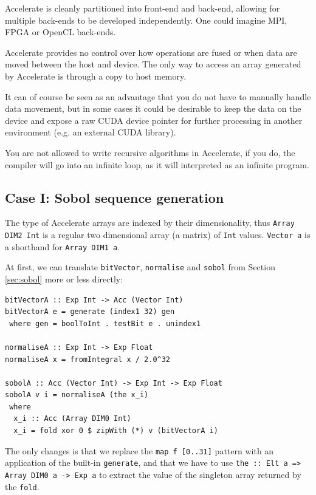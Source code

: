 \documentclass[preprint]{sigplanconf}
\begin{document}


Accelerate is cleanly partitioned into front-end and back-end,
allowing for multiple back-ends to be developed independently. One
could imagine MPI, FPGA or OpenCL back-ends.

Accelerate provides no control over how operations are fused or when
data are moved between the host and device. The only way to access an
array generated by Accelerate is through a copy to host memory.

It can of course be seen as an advantage that you do not have to
manually handle data movement, but in some cases it could be desirable
to keep the data on the device and expose a raw CUDA device pointer
for further processing in another environment (e.g. an external CUDA
library).

You are not allowed to write recursive algorithms in Accelerate, if
you do, the compiler will go into an infinite loop, as it will
interpreted as an infinite program.

\subsection{Case I: Sobol sequence generation}
The type of Accelerate arrays are indexed by their dimensionality,
thus \verb|Array DIM2 Int| is a regular two dimensional array (a
matrix) of \verb|Int| values.  \verb|Vector a| is a shorthand for
\verb|Array DIM1 a|.

At first, we can translate \verb|bitVector|, \verb|normalise| and
\verb|sobol| from Section \ref{sec:sobol} more or less directly:
\begin{verbatim}
bitVectorA :: Exp Int -> Acc (Vector Int)
bitVectorA e = generate (index1 32) gen
 where gen = boolToInt . testBit e . unindex1

normaliseA :: Exp Int -> Exp Float
normaliseA x = fromIntegral x / 2.0^32

sobolA :: Acc (Vector Int) -> Exp Int -> Exp Float
sobolA v i = normaliseA (the x_i)
 where
  x_i :: Acc (Array DIM0 Int)
  x_i = fold xor 0 $ zipWith (*) v (bitVectorA i)
\end{verbatim}
The only changes is that we replace the \verb|map f [0..31]| pattern
with an application of the built-in \verb|generate|, and that we have
to use \verb|the :: Elt a => Array DIM0 a -> Exp a| to extract the
value of the singleton array returned by the \verb|fold|.
\end{document}
